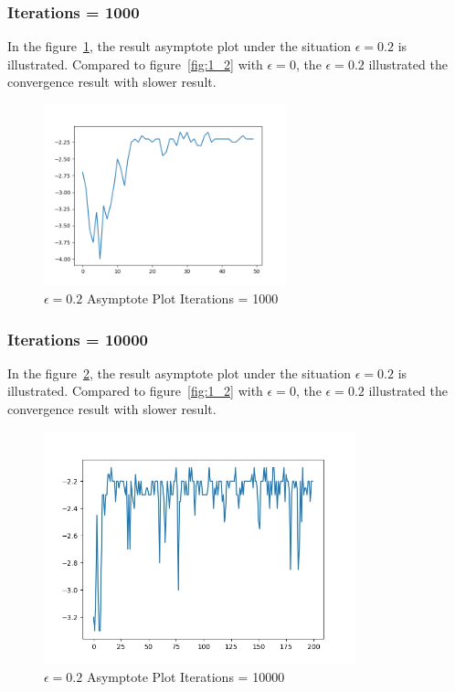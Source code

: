 \documentclass[11pt, a4paper]{article}
\begin{document}
\subsubsection{Iterations = 1000}

In the figure~\ref{fig:3_1}, the result asymptote plot under the situation $\epsilon = 0.2$ is illustrated. Compared to figure~\ref{fig:1_2} with $\epsilon = 0$, the $\epsilon = 0.2$ illustrated the convergence result with slower result. 

\begin{figure}[htbp] 
	\begin{center}
		\includegraphics[width=7cm]{3_e_2} 
		\caption{$\epsilon = 0.2$ Asymptote Plot Iterations = 1000} 
		\label{fig:3_1}
	\end{center}
\end{figure}

\subsubsection{Iterations = 10000}

In the figure~\ref{fig:3_2}, the result asymptote plot under the situation $\epsilon = 0.2$ is illustrated. Compared to figure~\ref{fig:1_2} with $\epsilon = 0$, the $\epsilon = 0.2$ illustrated the convergence result with slower result. 

\begin{figure}[htbp] 
	\begin{center}
		\includegraphics[width=9cm]{3_e_3} 
		\caption{$\epsilon = 0.2$ Asymptote Plot Iterations = 10000} 
		\label{fig:3_2}
	\end{center}
\end{figure}
\end{document}
